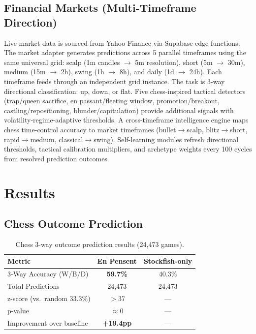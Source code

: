 \documentclass[11pt,a4paper]{article}
\begin{document}
\subsection{Financial Markets (Multi-Timeframe Direction)}
Live market data is sourced from Yahoo Finance via Supabase edge functions.
The market adapter generates predictions across 5 parallel timeframes using
the same universal grid: scalp (1m candles $\to$ 5m resolution), short (5m $\to$ 30m),
medium (15m $\to$ 2h), swing (1h $\to$ 8h), and daily (1d $\to$ 24h). Each timeframe
feeds through an independent grid instance. The task is 3-way directional
classification: up, down, or flat. Five chess-inspired tactical detectors
(trap/queen sacrifice, en passant/fleeting window, promotion/breakout,
castling/repositioning, blunder/capitulation) provide additional signals with
volatility-regime-adaptive thresholds. A cross-timeframe intelligence engine
maps chess time-control accuracy to market timeframes (bullet$\to$scalp,
blitz$\to$short, rapid$\to$medium, classical$\to$swing). Self-learning modules refresh
directional thresholds, tactical calibration multipliers, and archetype weights
every 100 cycles from resolved prediction outcomes.

\section{Results}

\subsection{Chess Outcome Prediction}

\begin{table}[h]
\centering
\caption{Chess 3-way outcome prediction results (24,473 games).}
\label{tab:chess}
\begin{tabular}{lcc}
\toprule
\textbf{Metric} & \textbf{En Pensent} & \textbf{Stockfish-only} \\
\midrule
3-Way Accuracy (W/B/D)     & \textbf{59.7\%} & 40.3\% \\
Total Predictions           & 24,473          & 24,473 \\
z-score (vs.\ random 33.3\%) & $>$37          & --- \\
p-value                     & $\approx 0$    & --- \\
Improvement over baseline   & \textbf{+19.4pp} & --- \\
\bottomrule
\end{tabular}
\end{table}
\end{document}
